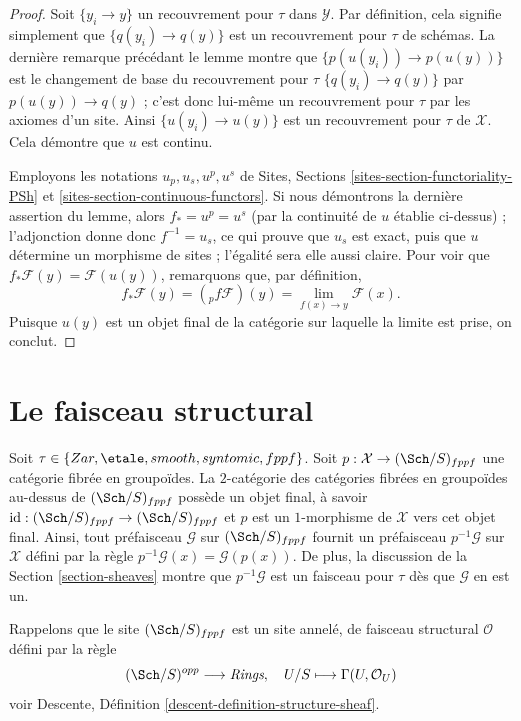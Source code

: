 \begin{proof}
Soit $\{y_i \to y\}$ un recouvrement pour $\tau$ dans $\mathcal{Y}$. Par définition,
cela signifie simplement que $\{q(y_i) \to q(y)\}$ est un recouvrement pour $\tau$ de
schémas. La dernière remarque précédant le lemme montre que
$\{p(u(y_i)) \to p(u(y))\}$ est le changement de base du recouvrement pour $\tau$
$\{q(y_i) \to q(y)\}$ par $p(u(y)) \to q(y)$ ; c'est donc lui-même un
recouvrement pour $\tau$ par les axiomes d'un site. Ainsi $\{u(y_i) \to u(y)\}$
est un recouvrement pour $\tau$ de $\mathcal{X}$. Cela démontre que $u$ est
continu.

\medskip\noindent
Employons les notations $u_p, u_s, u^p, u^s$ de
Sites, Sections \ref{sites-section-functoriality-PSh} et
\ref{sites-section-continuous-functors}.
Si nous démontrons la dernière assertion du lemme, alors
$f_* = u^p = u^s$ (par la continuité de $u$ établie ci-dessus) ; l'adjonction donne donc
$f^{-1} = u_s$, ce qui prouve que $u_s$ est exact, puis que $u$ détermine
un morphisme de sites ; l'égalité sera elle aussi claire.
Pour voir que $f_*\mathcal{F}(y) = \mathcal{F}(u(y))$, remarquons que, par
définition,
$$
f_*\mathcal{F}(y) = ({}_pf\mathcal{F})(y) =
\lim_{f(x) \to y} \mathcal{F}(x).
$$
Puisque $u(y)$ est un objet final de la catégorie sur laquelle la limite est
prise, on conclut.
\end{proof}





\section{Le faisceau structural}
\label{section-structure-sheaf}

\noindent
Soit $\tau \in \{Zar, \etale, smooth, syntomic, fppf\}$.
Soit $p : \mathcal{X} \to (\Sch/S)_{fppf}$ une catégorie
fibrée en groupoïdes. La $2$-catégorie des catégories fibrées en groupoïdes au-dessus de
$(\Sch/S)_{fppf}$ possède un objet final, à savoir
$\text{id} : (\Sch/S)_{fppf} \to (\Sch/S)_{fppf}$
et $p$ est un $1$-morphisme de $\mathcal{X}$ vers cet objet final.
Ainsi, tout préfaisceau $\mathcal{G}$ sur $(\Sch/S)_{fppf}$ fournit un
préfaisceau $p^{-1}\mathcal{G}$ sur $\mathcal{X}$ défini par la règle
$p^{-1}\mathcal{G}(x) = \mathcal{G}(p(x))$. De plus, la discussion de la
Section \ref{section-sheaves}
montre que $p^{-1}\mathcal{G}$ est un faisceau pour $\tau$ dès que
$\mathcal{G}$ en est un.

\medskip\noindent
Rappelons que le site $(\Sch/S)_{fppf}$ est un site annelé,
de faisceau structural $\mathcal{O}$ défini par la règle
$$
(\Sch/S)^{opp} \longrightarrow \textit{Rings},
\quad
U/S \longmapsto \Gamma(U, \mathcal{O}_U)
$$
voir
Descente, Définition \ref{descent-definition-structure-sheaf}.

